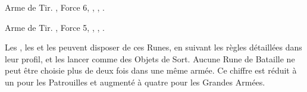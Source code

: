\closearmyspecialrules






\vspace*{1.5cm}
\startarmyarmoury

\startitemlistonecol

\listitemonecol{\wyrmslayerrocket} Arme de Tir. , Force 6, \flamingattacks{}, , \reload{}.

\listitemonecol{\forgerepeater} Arme de Tir. , Force 5, \flamingattacks{}, , \quicktofire{}.

\enditemlistonecol

\closearmyarmoury





\subtitle{}

Les \runicmasters{}, les \runicsmiths{} et les \anvilsofpower{} peuvent disposer de ces Runes, en suivant les règles détaillées dans leur profil, et les lancer comme des Objets de Sort. Aucune Rune de Bataille ne peut être choisie plus de deux fois dans une même armée. Ce chiffre est réduit à un pour les Patrouilles et augmenté à quatre pour les Grandes Armées.

\vspace*{1.5cm}
\def\Z{\vphantom{\parbox[c]{2.5cm}{\fontsize{25}{30}\selectfont Some\newline Very\newline Long}}}

